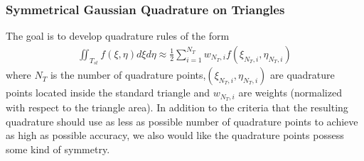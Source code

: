 \documentclass[a4paper]{article}
\numberwithin{equation}{section}
\begin{document}
\subsubsection{Symmetrical Gaussian Quadrature on Triangles}
The goal is to develop quadrature rules of the form
\begin{align}
\label{5.29}
\iint_{{T_{st}}} {f\left( {\xi ,\eta } \right)d\xi d\eta } \approx \frac{1}{2}\sum\limits_{i = 1}^{{N_T}} {{w_{{N_T},i}}f\left( {{\xi _{{N_T},i}},{\eta _{{N_T},i}}} \right)}
\end{align}
where $N_T$ is the number of quadrature points,${\left( {{\xi _{{N_T},i}},{\eta _{{N_T},i}}} \right)}$ are quadrature points located inside the standard triangle and $w_{{N_T},i}$ are weights (normalized with respect to the triangle area). In addition to the criteria that the resulting quadrature should use as less as possible number of quadrature points to achieve as high as possible accuracy, we also would like the quadrature points possess some kind of symmetry.
\end{document}
